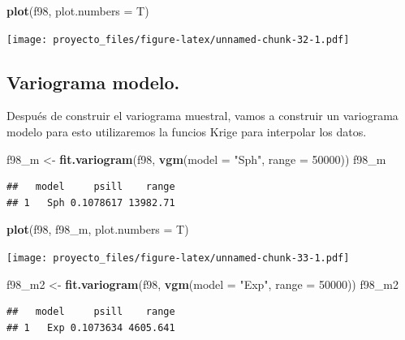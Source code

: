 \documentclass[11pt,]{article}
\newenvironment{Shaded}{\begin{snugshade}}{\end{snugshade}}
\newcommand{\KeywordTok}[1]{\textcolor[rgb]{0.13,0.29,0.53}{\textbf{#1}}}
\newcommand{\DataTypeTok}[1]{\textcolor[rgb]{0.13,0.29,0.53}{#1}}
\newcommand{\DecValTok}[1]{\textcolor[rgb]{0.00,0.00,0.81}{#1}}
\newcommand{\StringTok}[1]{\textcolor[rgb]{0.31,0.60,0.02}{#1}}
\newcommand{\NormalTok}[1]{#1}
\begin{document}
\begin{Shaded}
\begin{Highlighting}[]
\KeywordTok{plot}\NormalTok{(f98, }\DataTypeTok{plot.numbers =}\NormalTok{ T)}
\end{Highlighting}
\end{Shaded}

\texttt{[image: proyecto\_files/figure-latex/unnamed-chunk-32-1.pdf]}

\subsection{Variograma modelo.}\label{variograma-modelo.}

Después de construir el variograma muestral, vamos a construir un
variograma modelo para esto utilizaremos la funcios Krige para
interpolar los datos.

\begin{Shaded}
\begin{Highlighting}[]
\NormalTok{f98_m <-}\StringTok{ }\KeywordTok{fit.variogram}\NormalTok{(f98, }\KeywordTok{vgm}\NormalTok{(}\DataTypeTok{model =} \StringTok{"Sph"}\NormalTok{, }\DataTypeTok{range =} \DecValTok{50000}\NormalTok{))}
\NormalTok{f98_m}
\end{Highlighting}
\end{Shaded}

\begin{verbatim}
##   model     psill    range
## 1   Sph 0.1078617 13982.71
\end{verbatim}

\begin{Shaded}
\begin{Highlighting}[]
\KeywordTok{plot}\NormalTok{(f98, f98_m, }\DataTypeTok{plot.numbers =}\NormalTok{ T)}
\end{Highlighting}
\end{Shaded}

\texttt{[image: proyecto\_files/figure-latex/unnamed-chunk-33-1.pdf]}

\begin{Shaded}
\begin{Highlighting}[]
\NormalTok{f98_m2 <-}\StringTok{ }\KeywordTok{fit.variogram}\NormalTok{(f98, }\KeywordTok{vgm}\NormalTok{(}\DataTypeTok{model =} \StringTok{"Exp"}\NormalTok{, }\DataTypeTok{range =} \DecValTok{50000}\NormalTok{))}
\NormalTok{f98_m2}
\end{Highlighting}
\end{Shaded}

\begin{verbatim}
##   model     psill    range
## 1   Exp 0.1073634 4605.641
\end{verbatim}
\end{document}
